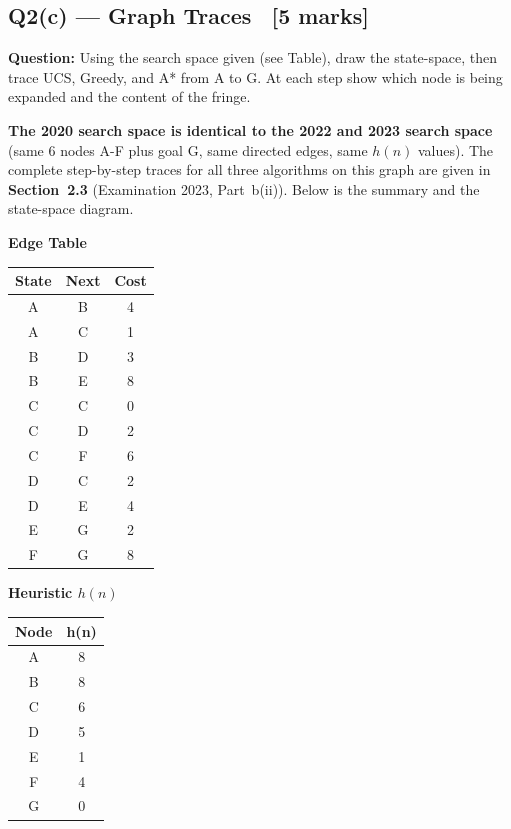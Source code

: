 \documentclass[12pt, a4paper]{article}
\newenvironment{solutionbox}{\begin{mdframed}[style=solutionframe]}{\end{mdframed}}
\begin{document}
\subsection{Q2(c) — Graph Traces \ [5 marks]}

\begin{solutionbox}
\textbf{Question:} Using the search space given (see Table), draw the state-space, then trace UCS, Greedy, and A* from A to G. At each step show which node is being expanded and the content of the fringe.
\end{solutionbox}

\vspace{0.6em}

\noindent\textbf{The 2020 search space is identical to the 2022 and 2023 search space} (same 6 nodes A-F plus goal G, same directed edges, same $h(n)$ values). The complete step-by-step traces for all three algorithms on this graph are given in \textbf{Section~2.3} (Examination 2023, Part~b(ii)). Below is the summary and the state-space diagram.

\vspace{0.6em}

\begin{minipage}[t]{0.48\textwidth}
\centering
{\small\textbf{Edge Table}}\\[0.3em]
\begin{tabular}{ccc}
\toprule
\textbf{State} & \textbf{Next} & \textbf{Cost} \\
\midrule
A & B & 4 \\
A & C & 1 \\
B & D & 3 \\
B & E & 8 \\
C & C & 0 \\
C & D & 2 \\
C & F & 6 \\
D & C & 2 \\
D & E & 4 \\
E & G & 2 \\
F & G & 8 \\
\bottomrule
\end{tabular}
\end{minipage}
\hfill
\begin{minipage}[t]{0.48\textwidth}
\centering
{\small\textbf{Heuristic $h(n)$}}\\[0.3em]
\begin{tabular}{cc}
\toprule
\textbf{Node} & \textbf{h(n)} \\
\midrule
A & 8 \\
B & 8 \\
C & 6 \\
D & 5 \\
E & 1 \\
F & 4 \\
G & 0 \\
\bottomrule
\end{tabular}
\end{minipage}
\end{document}
